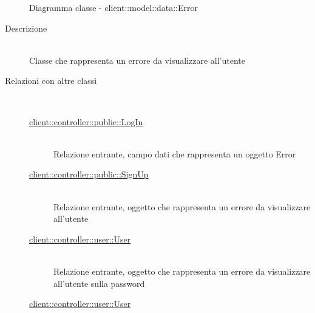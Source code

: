 \vspace{0.5cm}
\hypertarget{client::model::data::Error}{}
\begin{figure}[H]
	\centering
	\caption{Diagramma classe - client::model::data::Error}
\end{figure}\begin{description}
\item[Descrizione] \hfill \\
Classe che rappresenta un errore da visualizzare all'utente
\item[Relazioni con altre classi] \hfill \\
\vspace{-7mm}
\begin{description}
	\item[\hyperlink{client::controller::public::LogIn}{client::controller::public::LogIn}] \hfill \\
	Relazione entrante, campo dati che rappresenta un oggetto Error
	\item[\hyperlink{client::controller::public::SignUp}{client::controller::public::SignUp}] \hfill \\
	Relazione entrante, oggetto che rappresenta un errore da visualizzare all'utente
	\item[\hyperlink{client::controller::user::User}{client::controller::user::User}] \hfill \\
	Relazione entrante, oggetto che rappresenta un errore da visualizzare all'utente sulla password
	\item[\hyperlink{client::controller::user::User}{client::controller::user::User}] \hfill \\

\end{description}
\end{description}
